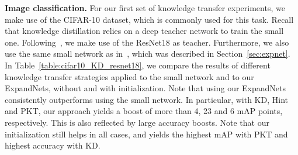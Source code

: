 \documentclass[10pt,twocolumn,letterpaper]{article}
\begin{document}
\begin{table}[t]
    \centering
    \vspace{0.02cm}
    \caption{{\bf Knowledge transfer from the ResNet18 on CIFAR-10.} Using ExpandNets as student networks yields consistently better results than directly using the small network.}
    \label{table:cifar10_KD_resnet18}
\end{table}\vspace{0.2cm}\noindent\textbf{Image classification.} For our first set of knowledge transfer experiments, we make use of the CIFAR-10 dataset, which is commonly used for this task. Recall that knowledge distillation relies on a deep teacher network to train the small one. Following~\cite{pkt_eccv}, we make use of the ResNet18 as teacher. Furthermore, we also use the same small network as in~\cite{pkt_eccv}, which was described in Section~\ref{sec:expnet}. In Table~\ref{table:cifar10_KD_resnet18}, we compare the results of different knowledge transfer strategies applied to the small network and to our ExpandNets, without and with initialization. Note that using our ExpandNets consistently outperforms using the small network. In particular, with KD, Hint and PKT, our approach yields a boost of more than 4, 23 and 6 mAP points, respectively. This is also reflected by large accuracy boosts. Note that our initialization still helps in all cases, and yields the highest mAP with PKT and highest accuracy with KD.
\end{document}

